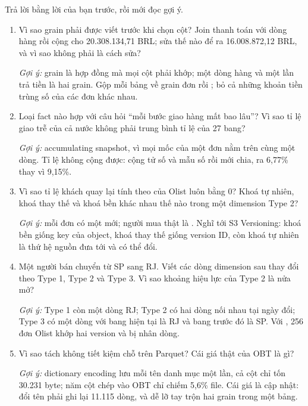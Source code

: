 Trả lời bằng lời của bạn trước, rồi mới đọc gợi ý.

\begin{enumerate}
  \item Vì sao grain phải được viết trước khi chọn cột? Join thanh toán với dòng hàng rồi cộng  cho 20.308.134,71 BRL; sửa thế nào để ra 16.008.872,12 BRL, và vì sao  không phải là cách sửa?\par
  \textit{Gợi ý:} grain là hợp đồng mà mọi cột phải khớp; một dòng hàng và một lần trả tiền là hai grain. Gộp mỗi bảng về grain đơn rồi ;  bỏ cả những khoản tiền trùng số của các đơn khác nhau.
  \item Loại fact nào hợp với câu hỏi ``mỗi bước giao hàng mất bao lâu''? Vì sao tỉ lệ giao trễ của cả nước không phải trung bình tỉ lệ của 27 bang?\par
  \textit{Gợi ý:} accumulating snapshot, vì mọi mốc của một đơn nằm trên cùng một dòng. Tỉ lệ không cộng được: cộng tử số và mẫu số rồi mới chia, ra 6,77\% thay vì 9,15\%.
  \item Vì sao tỉ lệ khách quay lại tính theo  của Olist luôn bằng 0? Khoá tự nhiên, khoá thay thế và khoá bền khác nhau thế nào trong một dimension Type 2?\par
  \textit{Gợi ý:} mỗi đơn có một  mới; người mua thật là . Nghĩ tới S3 Versioning: khoá bền giống key của object, khoá thay thế giống version ID, còn khoá tự nhiên là thứ hệ nguồn đưa tới và có thể đổi.
  \item Một người bán chuyển từ SP sang RJ. Viết các dòng dimension sau thay đổi theo Type 1, Type 2 và Type 3. Vì sao khoảng hiệu lực của Type 2 là nửa mở?\par
  \textit{Gợi ý:} Type 1 còn một dòng RJ; Type 2 có hai dòng nối nhau tại ngày đổi; Type 3 có một dòng với bang hiện tại là RJ và bang trước đó là SP. Với , 256 đơn Olist khớp hai version và bị nhân dòng.
  \item Vì sao tách  không tiết kiệm chỗ trên Parquet? Cái giá thật của OBT là gì?\par
  \textit{Gợi ý:} dictionary encoding lưu mỗi tên danh mục một lần, cả cột  chỉ tốn 30.231 byte; năm cột chép vào OBT chỉ chiếm 5,6\% file. Cái giá là cập nhật: đổi tên  phải ghi lại 11.115 dòng, và dễ lỡ tay trộn hai grain trong một bảng.

\end{enumerate}

